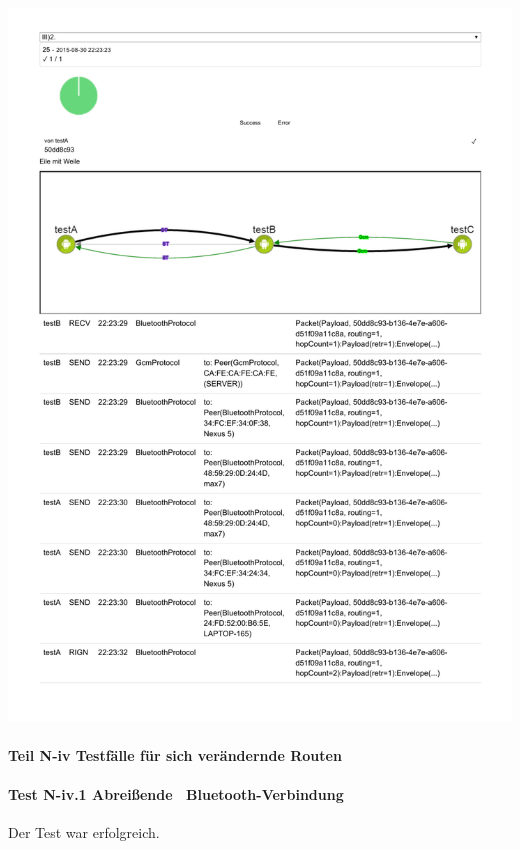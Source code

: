 \includegraphics[trim=0 120 0 0,clip,scale=0.8]{belege/manuelle-tests/netzwerk/Dashboardauszuege/Netzwerktest_III-2.pdf}
\clearpage


\paragraph{Teil N-iv Testfälle für sich verändernde Routen}

\paragraph{Test N-iv.1 \glqq Abreißende\grqq~ Bluetooth-Verbindung}

Der Test war erfolgreich.

